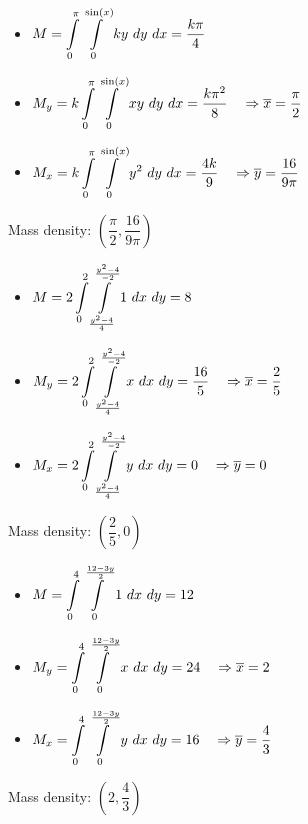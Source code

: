 \begin{Answer}
    
        \Question  \begin{itemize}
            \item $M = \displaystyle \int\limits_0^{\pi}\int\limits_{0}^{\sin(x)}ky \ dy\  dx = \dfrac{k \pi}{4}$ 
            \item $M_{y} = k \displaystyle \int\limits_0^{\pi}\int\limits_{0}^{\sin(x)} xy \ dy\  dx = \dfrac{k \pi^2}{8} \quad \Rightarrow \overline{x} = \dfrac{\pi}{2}$
            \item $M_{x} = k \displaystyle \int\limits_0^{\pi}\int\limits_{0}^{\sin(x)} y^2 \ dy\  dx = \dfrac{4 k }{9}  \quad \Rightarrow \overline{y} = \dfrac{16}{9\pi} $
        \end{itemize}
         Mass density: $\left(\dfrac{\pi}{2}, \dfrac{16}{9\pi}\right)$
        
        \Question  
        \begin{itemize}
            \item $M = 2 \displaystyle \int\limits_0^{2} \displaystyle \int\limits_{\frac{y^2-4}{4}}^{\frac{y^2-4}{-2}} 1 \ dx\  dy = 8$ 
            \item $M_{y} = 2 \ds \int\limits_0^{2}\int\limits_{\frac{y^2-4}{4}}^{\frac{y^2-4}{-2}} x \ dx\  dy = \dfrac{16}{5} \quad \Rightarrow \overline{x} = \dfrac{2}{5}$ 
            \item $M_{x} = 2 \ds \int\limits_0^{2}\int\limits_{\frac{y^2-4}{4}}^{\frac{y^2-4}{-2}} y \ dx\  dy = 0 \quad \Rightarrow \overline{y} = 0 $ 
        \end{itemize}
        Mass density: $\left(\dfrac{2}{5}, 0\right)$
        
        \Question  
        \begin{itemize}
            \item $M = \displaystyle \int\limits_0^{4} \displaystyle \int\limits_{0}^{\frac{12-3y}{2}} 1 \ dx\  dy = 12$ 
            \item $M_{y} = \displaystyle \int\limits_0^{4} \displaystyle \int\limits_{0}^{\frac{12-3y}{2}} x \ dx\  dy = 24 \quad \Rightarrow \overline{x} = 2$ 
            \item $M_{x} = \displaystyle \int\limits_0^{4} \displaystyle \int\limits_{0}^{\frac{12-3y}{2}} y \ dx\  dy = 16 \quad \Rightarrow \overline{y} = \dfrac{4}{3}$ 
        \end{itemize}
        Mass density: $\left(2,\dfrac{4}{3}\right)$
        
    
\end{Answer} 


